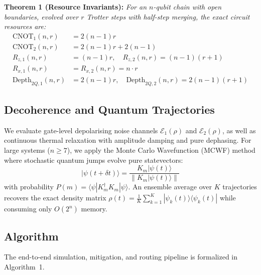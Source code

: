 \documentclass[conference]{IEEEtran}
\begin{document}
\textbf{Theorem 1 (Resource Invariants):}
\textit{For an $n$-qubit chain with open boundaries, evolved over $r$ Trotter steps with half-step merging, the exact circuit resources are:}
\begin{align}
\text{CNOT}_1(n, r) &= 2(n-1)r \\
\text{CNOT}_2(n, r) &= 2(n-1)r + 2(n-1) \\
R_{z, 1}(n, r) &= (n-1)r, \quad R_{z, 2}(n, r) = (n-1)(r+1) \\
R_{x, 1}(n, r) &= R_{x, 2}(n, r) = n \cdot r \\
\text{Depth}_{2Q, 1}(n, r) &= 2(n-1)r, \quad \text{Depth}_{2Q, 2}(n, r) = 2(n-1)(r+1)
\end{align}

\subsection{Decoherence and Quantum Trajectories}
We evaluate gate-level depolarising noise channels $\mathcal{E}_1(\rho)$ and $\mathcal{E}_2(\rho)$, as well as continuous thermal relaxation with amplitude damping and pure dephasing. For large systems ($n \ge 7$), we apply the Monte Carlo Wavefunction (MCWF) method where stochastic quantum jumps evolve pure statevectors:
\begin{equation}
|\psi(t + \delta t)\rangle = \frac{K_m |\psi(t)\rangle}{\|K_m |\psi(t)\rangle\|}
\end{equation}
with probability $P(m) = \langle \psi | K_m^\dagger K_m | \psi \rangle$. An ensemble average over $K$ trajectories recovers the exact density matrix $\rho(t) = \frac{1}{K} \sum_{k=1}^K |\psi_k(t)\rangle \langle \psi_k(t)|$ while consuming only $O(2^n)$ memory.

\subsection{Algorithm}
The end-to-end simulation, mitigation, and routing pipeline is formalized in Algorithm~1.
\end{document}
